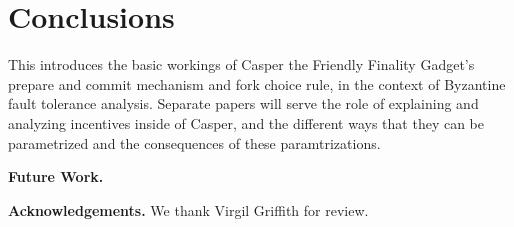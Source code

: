 \documentclass[12pt]{article}
\begin{document}
\section{Conclusions}

This introduces the basic workings of Casper the Friendly Finality Gadget's prepare and commit mechanism and fork choice rule, in the context of Byzantine fault tolerance analysis. Separate papers will serve the role of explaining and analyzing incentives inside of Casper, and the different ways that they can be parametrized and the consequences of these paramtrizations.

\textbf{Future Work.} 

\textbf{Acknowledgements.} We thank Virgil Griffith for review.



%
%



\end{document}
